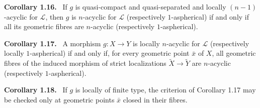 \documentclass[12pt]{article}
\newcommand{\LL}{\mathcal L}
\newenvironment{statement}[1]{\par\medskip\noindent\textbf{#1.}\ }{\par\medskip}
\begin{document}
\begin{statement}{Corollary 1.16}
If \(g\) is quasi-compact and quasi-separated and locally \((n-1)\)-acyclic for \(\LL\), then \(g\) is \(n\)-acyclic for \(\LL\) (respectively \(1\)-aspherical) if and only if all its geometric fibres are \(n\)-acyclic (respectively \(1\)-aspherical).
\end{statement}

\begin{statement}{Corollary 1.17}
A morphism \(g:X\to Y\) is locally \(n\)-acyclic for \(\LL\) (respectively locally \(1\)-aspherical) if and only if, for every geometric point \(\bar x\) of \(X\), all geometric fibres of the induced morphism of strict localizations \(\widetilde X\to\widetilde Y\) are \(n\)-acyclic (respectively \(1\)-aspherical).
\end{statement}

\begin{statement}{Corollary 1.18}
If \(g\) is locally of finite type, the criterion of Corollary 1.17 may be checked only at geometric points \(\bar x\) closed in their fibres.
\end{statement}
\end{document}
